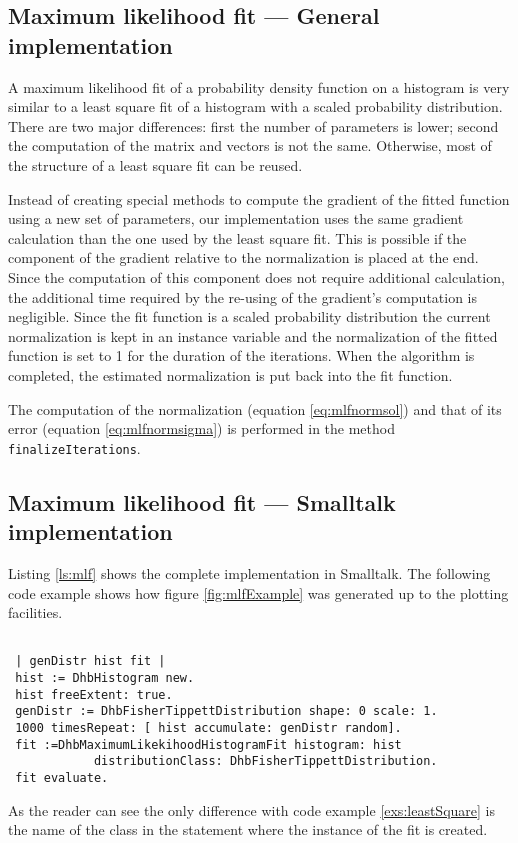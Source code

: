 \documentclass[twoside]{book}
\begin{document}
\subsection{Maximum likelihood fit --- General  implementation}
 A maximum likelihood fit
of a probability density function on a histogram is very similar
to a least square fit of a histogram with a scaled probability
distribution. There are two major differences: first the number of
parameters is lower; second the computation of the matrix and
vectors is not the same. Otherwise, most of the structure of a
least square fit can be reused.

Instead of creating special methods to compute the gradient of the
fitted function using a new set of parameters, our implementation
uses the same gradient calculation than the one used by the least
square fit. This is possible if the component of the gradient
relative to the normalization is placed at the end. Since the
computation of this component does not require additional
calculation, the additional time required by the re-using of the
gradient's computation is negligible. Since the fit function is a
scaled probability distribution the current normalization is kept
in an instance variable and the normalization of the fitted
function is set to 1 for the duration of the iterations. When the
algorithm is completed, the estimated normalization is put back
into the fit function.

The computation of the normalization (equation
\ref{eq:mlfnormsol}) and that of its error (equation
\ref{eq:mlfnormsigma}) is performed in the method {\tt
finalizeIterations}.

\subsection{Maximum likelihood fit --- Smalltalk  implementation}
\label{sec:smlfhist}Listing \ref{ls:mlf} shows the complete
implementation in Smalltalk. The following code example shows how
figure \ref{fig:mlfExample} was generated up to the plotting
facilities.
\begin{codeExample}
\begin{verbatim}

 | genDistr hist fit |
 hist := DhbHistogram new.
 hist freeExtent: true.
 genDistr := DhbFisherTippettDistribution shape: 0 scale: 1.
 1000 timesRepeat: [ hist accumulate: genDistr random].
 fit :=DhbMaximumLikekihoodHistogramFit histogram: hist
            distributionClass: DhbFisherTippettDistribution.
 fit evaluate.
\end{verbatim}
\end{codeExample}
As the reader can see the only difference with code example
\ref{exs:leastSquare} is the name of the class in the statement
where the instance of the fit is created.
\end{document}
